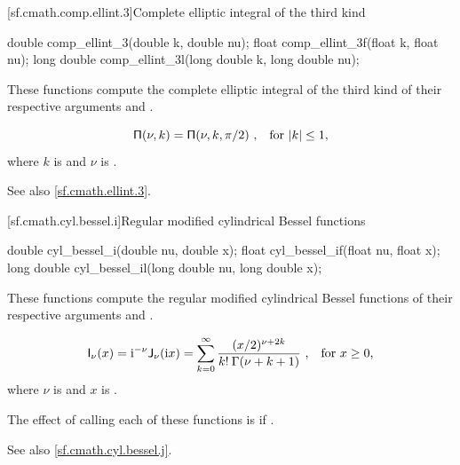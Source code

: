 [sf.cmath.comp.ellint.3]{Complete elliptic integral of the third kind}%
%
%
%
%
%
\begin{itemdecl}
double       comp_ellint_3(double k, double nu);
float        comp_ellint_3f(float k, float nu);
long double  comp_ellint_3l(long double k, long double nu);
\end{itemdecl}

\begin{itemdescr}
\pnum
\effects
These functions compute
the complete elliptic integral of the third kind
of their respective arguments
 and .

\pnum
\returns
\[ \mathsf{\Pi}(\nu, k) = \mathsf{\Pi}(\nu, k, \pi / 2) \text{ ,\quad for $|k| \le 1$,} \]
where
$k$ is  and
$\nu$ is .

\pnum
See also \ref{sf.cmath.ellint.3}.
\end{itemdescr}

[sf.cmath.cyl.bessel.i]{Regular modified cylindrical Bessel functions}%
%
%
%
%
%
\begin{itemdecl}
double       cyl_bessel_i(double nu, double x);
float        cyl_bessel_if(float nu, float x);
long double  cyl_bessel_il(long double nu, long double x);
\end{itemdecl}

\begin{itemdescr}
\pnum
\effects
These functions compute
the regular modified cylindrical Bessel functions
of their respective arguments
 and .

\pnum
\returns
\[ \mathsf{I}_\nu(x) =
     \mathrm{i}^{-\nu} \mathsf{J}_\nu(\mathrm{i}x) =
     \sum_{k=0}^\infty \frac{(x/2)^{\nu+2k}}{k! \: \Gamma(\nu+k+1)}
     \text{ ,\quad for $x \ge 0$,} \]
where
$\nu$ is  and
$x$ is .

\pnum
\remarks
The effect of calling each of these functions
is 
if .

\pnum
See also \ref{sf.cmath.cyl.bessel.j}.
\end{itemdescr}

